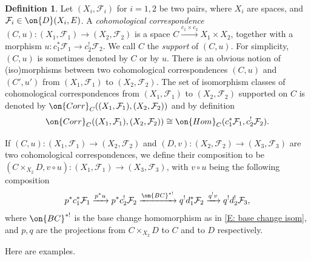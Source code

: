 \documentclass[11pt]{amsart}
\theoremstyle{definition}
\theoremstyle{definition}
\newtheorem{definition}[thm]{Definition}
\theoremstyle{definition}
\numberwithin{equation}{subsection}
\newcommand{\mF}{{\mathcal F}}
\newcommand{\Hom}{{\on{Hom}}}
\begin{document}
\begin{definition}
\label{AD:correspondences}
Let $(X_i,\mF_i)$ for $i=1,2$ be two pairs, where $X_i$ are spaces, and $\mF_i\in \on{D}(X_i,E)$. A \emph{cohomological correspondence} $(C,u):(X_1,\mF_1)\to (X_2,\mF_2)$ is a space $C\xrightarrow{c_1\times c_2} X_1\times  X_2$, together with a morphism $u:c_1^*\mF_1\to c_2^!\mF_2$. We call $C$ the \emph{support} of $(C,u)$. For simplicity, $(C,u)$ is sometimes denoted by $C$ or by $u$. There is an obvious notion of (iso)morphisms between two cohomological correspondences $(C,u)$ and $(C',u')$ from $(X_1,\mF_1)$ to $(X_2,\mF_2)$. The set of isomorphism classes of cohomological correspondences from $(X_1,\mF_1)$ to $(X_2,\mF_2)$ supported on $C$ is denoted by $\on{Corr}_C((X_1,\mF_1),(X_2,\mF_2))$ and by definition
\[\on{Corr}_C((X_1,\mF_1),(X_2,\mF_2))\cong \Hom_C(c_1^*\mF_1,c_2^!\mF_2).\]


If $(C,u):(X_1,\mF_1)\to (X_2,\mF_2)$ and $(D,v):(X_2,\mF_2)\to (X_3,\mF_3)$ are two cohomological correspondences, we define their composition to be $(C\times_{X_2}D,v\circ u):(X_1,\mF_1)\to (X_3,\mF_3)$, with $v\circ u$ being the following composition
\[p^*c_1^*\mF_1\xrightarrow{p^*u} p^*c_2^!\mF_2\xrightarrow{\on{BC}^{*!}} q^!d_1^*\mF_2\xrightarrow{q^!v} q^!d_2^!\mF_3,\]
where $\on{BC}^{*!}$ is the base change homomorphism as in \eqref{E: base change isom}, and $p, q$ are the projections from $C\times_{X_2}D$ to $C$ and to $D$ respectively.
\end{definition}


Here are examples.
\end{document}
